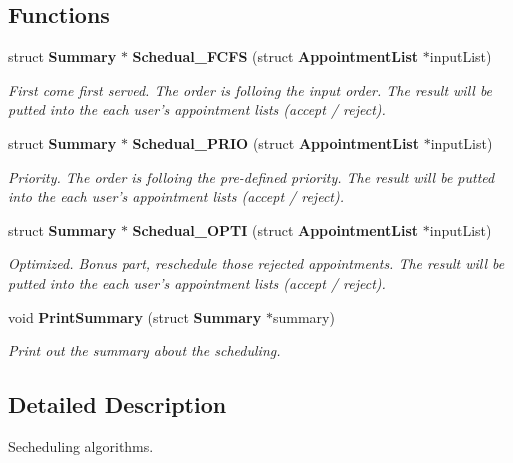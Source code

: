 \subsection*{Functions}
\begin{DoxyCompactItemize}
\item 
struct {\bf Summary} $\ast$ {\bf Schedual\+\_\+\+F\+C\+F\+S} (struct {\bf Appointment\+List} $\ast$input\+List)\label{scheduler_8h_ab1a6239f9cfb939239ea5a6327fc5396}

\begin{DoxyCompactList}\small\item\em First come first served. The order is folloing the input order. The result will be putted into the each user's appointment lists (accept / reject). \end{DoxyCompactList}\item 
struct {\bf Summary} $\ast$ {\bf Schedual\+\_\+\+P\+R\+I\+O} (struct {\bf Appointment\+List} $\ast$input\+List)\label{scheduler_8h_ace53e33f078566371bac6500f263b9e4}

\begin{DoxyCompactList}\small\item\em Priority. The order is folloing the pre-\/defined priority. The result will be putted into the each user's appointment lists (accept / reject). \end{DoxyCompactList}\item 
struct {\bf Summary} $\ast$ {\bf Schedual\+\_\+\+O\+P\+T\+I} (struct {\bf Appointment\+List} $\ast$input\+List)\label{scheduler_8h_a00e50377d32b3bee0e5d5982da684eb2}

\begin{DoxyCompactList}\small\item\em Optimized. Bonus part, reschedule those rejected appointments. The result will be putted into the each user's appointment lists (accept / reject). \end{DoxyCompactList}\item 
void {\bf Print\+Summary} (struct {\bf Summary} $\ast$summary)\label{scheduler_8h_aff1618f427d441142f2d7706441e8113}

\begin{DoxyCompactList}\small\item\em Print out the summary about the scheduling. \end{DoxyCompactList}\end{DoxyCompactItemize}


\subsection{Detailed Description}
Secheduling algorithms. 

